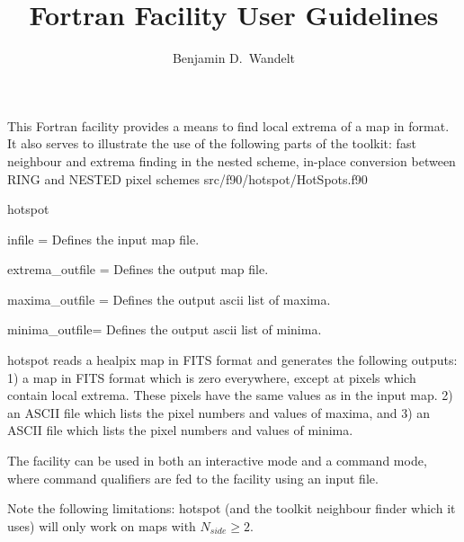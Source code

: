 
\sloppy


\title{\healpix Fortran Facility User Guidelines}
 \section[hotspot]{\nosectionname}
\label{fac:hotspot}
\author{Benjamin D.~Wandelt}

\begin{facility}
{This Fortran facility provides a means to find local extrema of
a map in \healpix format. It also serves to illustrate the use of the
following parts of the \healpix toolkit:
fast neighbour and extrema finding in the nested scheme,
in-place conversion between RING and NESTED pixel schemes } 
{src/f90/hotspot/HotSpots.f90}
\end{facility}

\begin{f90facility}
{hotspot}
\end{f90facility}

\begin{qualifiers}
  \begin{qulist}{} %
    \item[{infile = }] Defines the input map file.
    \item[{extrema\_outfile = }] Defines the output map file.
    \item[{maxima\_outfile = }] Defines the output ascii list of maxima.
    \item[{minima\_outfile=  }] Defines the output ascii list of minima.
  \end{qulist}
\end{qualifiers}

\begin{codedescription}
{
 hotspot reads a healpix map in FITS format and generates the following outputs: 
1) a \healpix map in FITS format which is zero everywhere, except at
 pixels which contain local extrema. These pixels have the same
 values as in the input map.
2) an ASCII file which lists the pixel numbers and values of
 maxima, and
3) an ASCII file which lists the pixel numbers and values of
 minima.

The facility can be used in both an interactive
mode and a command mode, where command qualifiers
are fed to the facility using an input file.

Note the following limitations:
hotspot (and the toolkit neighbour finder which it uses) will
only work on maps with $N_{side}\ge 2$.
}
\end{codedescription}

